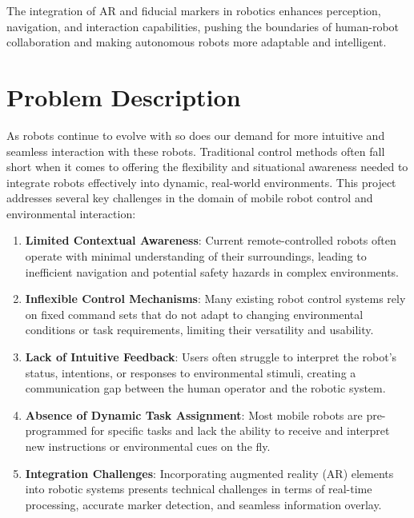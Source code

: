 The integration of AR and fiducial markers in robotics enhances perception, navigation, and interaction capabilities, pushing the boundaries of human-robot collaboration and making autonomous robots more adaptable and intelligent.





\section{\label{sec:probdesc}Problem Description}

As robots continue to evolve with so does our demand for more intuitive and seamless interaction with these robots. Traditional control methods often fall short when it comes to offering the flexibility and situational awareness needed to integrate robots effectively into dynamic, real-world environments. This project addresses several key challenges in the domain of mobile robot control and environmental interaction:

\begin{enumerate}
    \item \textbf{Limited Contextual Awareness}: Current remote-controlled robots often operate with minimal understanding of their surroundings, leading to inefficient navigation and potential safety hazards in complex environments.
    \item \textbf{Inflexible Control Mechanisms}: Many existing robot control systems rely on fixed command sets that do not adapt to changing environmental conditions or task requirements, limiting their versatility and usability.
    \item \textbf{Lack of Intuitive Feedback}: Users often struggle to interpret the robot's status, intentions, or responses to environmental stimuli, creating a communication gap between the human operator and the robotic system.
    \item \textbf{Absence of Dynamic Task Assignment}: Most mobile robots are pre-programmed for specific tasks and lack the ability to receive and interpret new instructions or environmental cues on the fly.
    \item \textbf{Integration Challenges}: Incorporating augmented reality (AR) elements into robotic systems presents technical challenges in terms of real-time processing, accurate marker detection, and seamless information overlay.
\end{enumerate}


